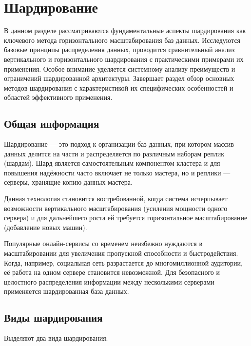 \section{Шардирование}

В данном разделе рассматриваются фундаментальные аспекты шардирования как
ключевого метода горизонтального масштабирования баз данных. Исследуются
базовые принципы распределения данных, проводится сравнительный анализ
вертикального и горизонтального шардирования с практическими примерами их
применения. Особое внимание уделяется системному анализу преимуществ и
ограничений шардированной архитектуры. Завершает раздел обзор основных методов
шардирования с характеристикой их специфических особенностей и областей
эффективного применения.

\subsection{Общая информация}

Шардирование — это подход к организации баз данных, при котором массив данных
делится на части и распределяется по различным наборам реплик (шардам). Шард
является самостоятельным компонентом кластера и для повышения надёжности часто
включает не только мастера, но и реплики — серверы, хранящие копию данных
мастера.

Данная технология становится востребованной, когда система исчерпывает
возможности вертикального масштабирования (усиления мощности одного сервера) и
для дальнейшего роста ей требуется горизонтальное масштабирование (добавление
новых машин).

Популярные онлайн-сервисы со временем неизбежно нуждаются в масштабировании для
увеличения пропускной способности и быстродействия. Когда, например, социальная
сеть разрастается до многомиллионной аудитории, её работа на одном сервере
становится невозможной. Для безопасного и целостного распределения информации
между несколькими серверами применяется шардированная база данных.

\subsection{Виды шардирования}

Выделяют два вида шардирования:

